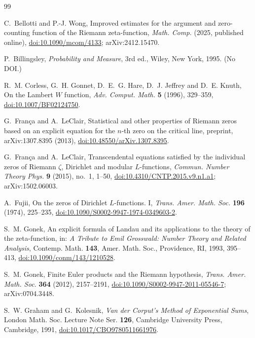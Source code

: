 \documentclass[11pt,reqno]{amsart}
\numberwithin{equation}{section}
\theoremstyle{plain}
\theoremstyle{definition}
\theoremstyle{remark}
\begin{document}
\begin{thebibliography}{99}

C.~Bellotti and P.-J. Wong, Improved estimates for the argument and zero-counting function of the Riemann zeta-function, \emph{Math. Comp.} (2025, published online), \href{https://doi.org/10.1090/mcom/4133}{doi:10.1090/mcom/4133}; arXiv:2412.15470.

P.~Billingsley, \emph{Probability and Measure}, 3rd ed., Wiley, New York, 1995. (No DOI.)

R.~M. Corless, G.~H. Gonnet, D.~E.~G. Hare, D.~J. Jeffrey and D.~E. Knuth, On the Lambert $W$ function, \emph{Adv. Comput. Math.} \textbf{5} (1996), 329--359, \href{https://doi.org/10.1007/BF02124750}{doi:10.1007/BF02124750}.

G.~Fran\c{c}a and A.~LeClair, Statistical and other properties of Riemann zeros based on an explicit equation for the $n$-th zero on the critical line, preprint, arXiv:1307.8395 (2013), \href{https://doi.org/10.48550/arXiv.1307.8395}{doi:10.48550/arXiv.1307.8395}.

G.~Fran\c{c}a and A.~LeClair, Transcendental equations satisfied by the individual zeros of Riemann $\zeta$, Dirichlet and modular $L$-functions, \emph{Commun. Number Theory Phys.} \textbf{9} (2015), no.~1, 1--50, \href{https://doi.org/10.4310/CNTP.2015.v9.n1.a1}{doi:10.4310/CNTP.2015.v9.n1.a1}; arXiv:1502.06003.

A.~Fujii, On the zeros of Dirichlet $L$-functions. I, \emph{Trans. Amer. Math. Soc.} \textbf{196} (1974), 225--235, \href{https://doi.org/10.1090/S0002-9947-1974-0349603-2}{doi:10.1090/S0002-9947-1974-0349603-2}.

S.~M. Gonek, An explicit formula of Landau and its applications to the theory of the zeta-function, in: \emph{A Tribute to Emil Grosswald: Number Theory and Related Analysis}, Contemp. Math. \textbf{143}, Amer. Math. Soc., Providence, RI, 1993, 395--413, \href{https://doi.org/10.1090/conm/143/1210528}{doi:10.1090/conm/143/1210528}.

S.~M. Gonek, Finite Euler products and the Riemann hypothesis, \emph{Trans. Amer. Math. Soc.} \textbf{364} (2012), 2157--2191, \href{https://doi.org/10.1090/S0002-9947-2011-05546-7}{doi:10.1090/S0002-9947-2011-05546-7}; arXiv:0704.3448.

S.~W. Graham and G.~Kolesnik, \emph{Van der Corput's Method of Exponential Sums}, London Math. Soc. Lecture Note Ser. \textbf{126}, Cambridge University Press, Cambridge, 1991, \href{https://doi.org/10.1017/CBO9780511661976}{doi:10.1017/CBO9780511661976}.


\end{thebibliography}
\end{document}
